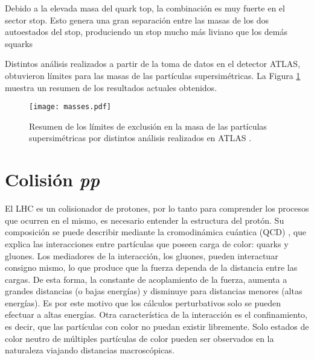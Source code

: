 Debido a la elevada masa del quark top, la combinación es muy fuerte en el sector stop. Esto genera una gran separación entre las masas de los dos autoestados del stop, produciendo un stop mucho más liviano que los demás squarks

Distintos análisis realizados a partir de la toma de datos en el detector ATLAS, obtuvieron límites para las masas de las partículas supersimétricas. La Figura \ref{masses} muestra un resumen de los resultados actuales obtenidos.

\begin{figure}[ht]
\centering
\texttt{[image: masses.pdf]}
\caption{Resumen de los límites de exclusión en la masa de las partículas supersimétricas por distintos análisis realizados en ATLAS \cite{masses_web}.}
\label{masses}
\end{figure}



\section{Colisión \textit{pp}}

El LHC es un colisionador de protones, por lo tanto para comprender los procesos que ocurren en el mismo, es necesario entender la estructura del protón. Su composición se puede describir mediante la cromodinámica cuántica (QCD) \cite{ellis1996}, que explica las interacciones entre partículas que poseen carga de color: quarks y gluones. Los mediadores de la interacción, los gluones, pueden interactuar consigno mismo, lo que produce que la fuerza dependa de la distancia entre las cargas. De esta forma, la constante de acoplamiento de la fuerza, aumenta a grandes distancias (o bajas energías) y disminuye para distancias menores (altas energías). Es por este motivo que los cálculos perturbativos solo se pueden efectuar a altas energías. Otra característica de la interacción es el confinamiento, es decir, que las partículas con color no puedan existir libremente. Solo estados de color neutro de múltiples partículas de color pueden ser observados en la naturaleza viajando distancias macroscópicas.

